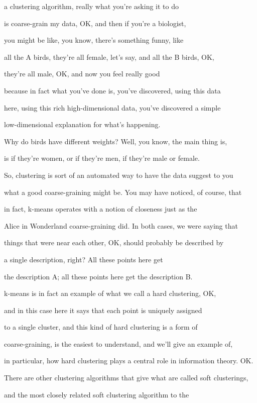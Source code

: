 \documentclass[]{article}
\begin{document}
a clustering algorithm,
really what you're asking it to do

is coarse-grain my data, OK,
and then if you're a biologist,

you might be like, you know,
there's something funny, like

all the A birds, they're all female,
let's say, and all the B birds, OK,

they're all male, OK,
and now you feel really good

because in fact what you've done is,
you've discovered, using this data

here, using this rich high-dimensional
data, you've discovered a simple

low-dimensional explanation
for what's happening.

Why do birds have different weights?
Well, you know, the main thing is,

is if they're women, or if they're men,
if they're male or female.

So, clustering is sort of an automated way
to have the data suggest to you

what a good coarse-graining might be.
You may have noticed, of course, that

in fact, k-means operates with a notion
of closeness just as the

Alice in Wonderland coarse-graining did.
In both cases, we were saying that

things that were near each other, OK,
should probably be described by

a single description, right?
All these points here get

the description A; all these points here
get the description B.

k-means is in fact an example of
what we call a hard clustering, OK,

and in this case here it says that
each point is uniquely assigned

to a single cluster, and this kind of
hard clustering is a form of

coarse-graining, is the easiest to
understand, and we'll give an example of,

in particular, how hard clustering plays
a central role in information theory. OK.

There are other clustering algorithms
that give what are called soft clusterings,

and the most closely related
soft clustering algorithm to the
\end{document}
